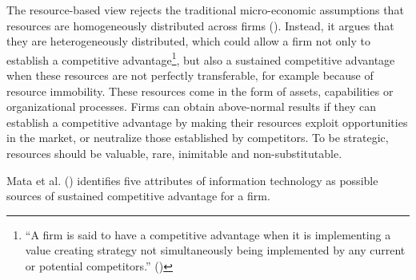 \documentclass[
  man,floatsintext]{apa6}
\begin{document}
The resource-based view rejects the traditional micro-economic assumptions that resources are homogeneously distributed across firms (). Instead, it argues that they are heterogeneously distributed, which could allow a firm not only to establish a competitive advantage\footnote{``A firm is said to have a competitive advantage when it is implementing a value creating strategy not simultaneously being implemented by any current or potential competitors.'' ()}, but also a sustained competitive advantage when these resources are not perfectly transferable, for example because of resource immobility. These resources come in the form of assets, capabilities or organizational processes. Firms can obtain above-normal results if they can establish a competitive advantage by making their resources exploit opportunities in the market, or neutralize those established by competitors. To be strategic, resources should be valuable, rare, inimitable and non-substitutable.

Mata et al. () identifies five attributes of information technology as possible sources of sustained competitive advantage for a firm.
\end{document}
